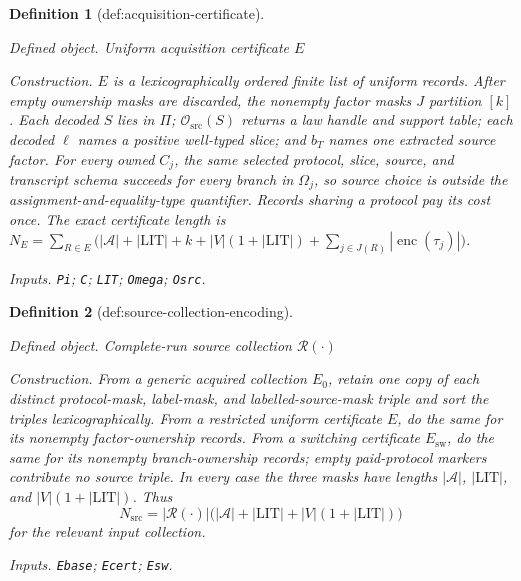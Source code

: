 \documentclass{article}
\newtheorem{definition}{Definition}
\begin{document}
\begin{definition}[def:acquisition-certificate]\label{def:acquisition-certificate}
\par\smallskip\noindent\emph{Defined object.} Uniform acquisition certificate \(E\)
\par\smallskip\noindent\emph{Construction.} \(E\) is a lexicographically ordered finite list of uniform records. After empty ownership masks are discarded, the nonempty factor masks \(J\) partition \([k]\). Each decoded \(S\) lies in \(\Pi\); \(\mathcal O_{\mathrm{src}}(S)\) returns a law handle and support table; each decoded \(\ell\) names a positive well-typed slice; and \(b_T\) names one extracted source factor. For every owned \(C_j\), the same selected protocol, slice, source, and transcript schema succeeds for every branch in \(\Omega_j\), so source choice is outside the assignment-and-equality-type quantifier. Records sharing a protocol pay its cost once. The exact certificate length is \(N_E=\sum_{R\in E}\bigl(|\mathcal A|+|\mathrm{LIT}|+k+|V|(1+|\mathrm{LIT}|)+\sum_{j\in J(R)}|\operatorname{enc}(\tau_j)|\bigr)\).
\par\smallskip\noindent\emph{Inputs.} \texttt{Pi}; \texttt{C}; \texttt{LIT}; \texttt{Omega}; \texttt{Osrc}.
\end{definition}

\begin{definition}[def:source-collection-encoding]\label{def:source-collection-encoding}
\par\smallskip\noindent\emph{Defined object.} Complete-run source collection \(\mathcal R(\cdot)\)
\par\smallskip\noindent\emph{Construction.} From a generic acquired collection \(E_0\), retain one copy of each distinct protocol-mask, label-mask, and labelled-source-mask triple and sort the triples lexicographically.  From a restricted uniform certificate \(E\), do the same for its nonempty factor-ownership records.  From a switching certificate \(E_{\mathrm{sw}}\), do the same for its nonempty branch-ownership records; empty paid-protocol markers contribute no source triple.  In every case the three masks have lengths \(|\mathcal A|\), \(|\mathrm{LIT}|\), and \(|V|(1+|\mathrm{LIT}|)\).  Thus
\[
 N_{\mathrm{src}}=|\mathcal R(\cdot)|
 \bigl(|\mathcal A|+|\mathrm{LIT}|+|V|(1+|\mathrm{LIT}|)\bigr)
\]
for the relevant input collection.
\par\smallskip\noindent\emph{Inputs.} \texttt{Ebase}; \texttt{Ecert}; \texttt{Esw}.
\end{definition}
\end{document}
